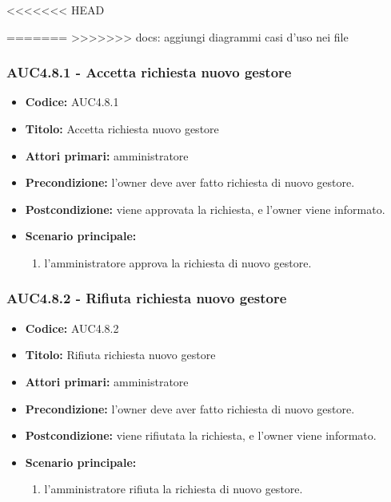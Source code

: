 \documentclass[casi-duso]{subfiles}
\begin{document}
<<<<<<< HEAD

=======
>>>>>>> docs: aggiungi diagrammi casi d'uso nei file
\subsubsection{AUC4.8.1 - Accetta richiesta nuovo gestore}%
\label{subsub:AUC4.8.1}
\begin{itemize}
  \item \textbf{Codice:} AUC4.8.1
  \item \textbf{Titolo:} Accetta richiesta nuovo gestore
  \item \textbf{Attori primari:} amministratore
  \item \textbf{Precondizione:} l'owner deve aver fatto richiesta di nuovo gestore.
  \item \textbf{Postcondizione:} viene approvata la richiesta, e l'owner viene informato.
  \item \textbf{Scenario principale:}
  \begin{enumerate}
    \item l'amministratore approva la richiesta di nuovo gestore.
  \end{enumerate}
\end{itemize}  

\subsubsection{AUC4.8.2 - Rifiuta richiesta nuovo gestore}%
\label{subsub:AUC4.8.2}
\begin{itemize}
  \item \textbf{Codice:} AUC4.8.2
  \item \textbf{Titolo:} Rifiuta richiesta nuovo gestore
  \item \textbf{Attori primari:} amministratore
  \item \textbf{Precondizione:} l'owner deve aver fatto richiesta di nuovo gestore.
  \item \textbf{Postcondizione:} viene rifiutata la richiesta, e l'owner viene informato.
  \item \textbf{Scenario principale:}
  \begin{enumerate}
    \item l'amministratore rifiuta la richiesta di nuovo gestore.
  \end{enumerate}
\end{itemize}  
\end{document}
